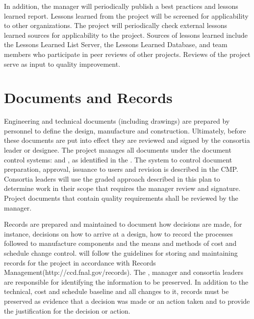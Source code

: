In addition, the   manager will
periodically publish a best practices and lessons learned
report. Lessons learned from the  project will be screened
for applicability to other organizations. The  project
will periodically check external lessons learned sources for
applicability to the  project. Sources of lessons learned
include the  Lessons Learned List Server, the \fnal {}
Lessons Learned Database, and  team members who
participate in peer reviews of other projects. Reviews of the
 project serve as input to quality improvement.

\section{Documents and Records}

Engineering and technical documents (including drawings) are prepared
by  personnel to define the design, manufacture and
construction. Ultimately, before these documents are put into effect
they are reviewed and signed by the  consortia leader or
designee. The
 project manages all documents under the document control
systems:  and \docdb, as identified in the 
.  The system to control document preparation, approval,
issuance to users and revision is described in the CMP. Consortia
leaders will use the graded approach described in this plan to
determine work in their scope that requires the 
 manager review and signature. Project documents that
contain quality requirements shall be reviewed by the
  manager.

Records are prepared and maintained to document how decisions are
made, for instance, decisions on how to arrive at a design, how to
record the processes followed to manufacture components and the means
and methods of cost and schedule change
control.  will follow the guidelines for
storing and maintaining records for the project in accordance with
\fnal Records Management(http://ccd.fnal.gov/records). The
 ,  
manager and consortia leaders are responsible for identifying the
information to be preserved. In addition to the technical, cost and
schedule baseline and all changes to it, records must be preserved as
evidence that a decision was made or an action taken and to provide
the justification for the decision or action.

